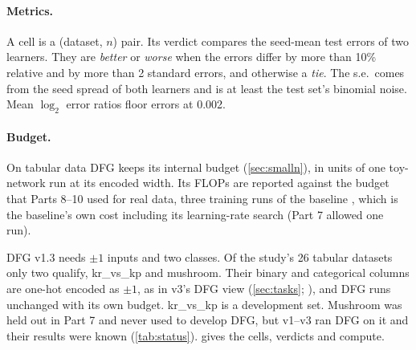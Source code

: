 \paragraph{Metrics.} A cell is a (dataset, $n$) pair. Its verdict compares the seed-mean test errors of two learners. They are \emph{better} or \emph{worse} when the errors differ by more than 10\% relative and by more than 2 standard errors, and otherwise a \emph{tie}. The s.e.\ comes from the seed spread of both learners and is at least the test set's binomial noise. Mean $\log_2$ error ratios floor errors at 0.002.

\paragraph{Budget.} On tabular data DFG keeps its internal budget (\cref{sec:smalln}), in units of one toy-network run at its encoded width. Its FLOPs are reported against the budget that Parts 8--10 used for real data, three training runs of the baseline , which is the baseline's own cost including its learning-rate search (Part 7 allowed one run).

DFG v1.3 needs $\pm1$ inputs and two classes. Of the study's 26 tabular datasets only two qualify, kr\_vs\_kp and mushroom. Their binary and categorical columns are one-hot encoded as $\pm1$, as in v3's DFG view (\cref{sec:tasks}; ), and DFG runs unchanged with its own budget. kr\_vs\_kp is a development set. Mushroom was held out in Part 7 and never used to develop DFG, but v1--v3 ran DFG on it and their results were known (\cref{tab:status}).  gives the cells, verdicts and compute.

